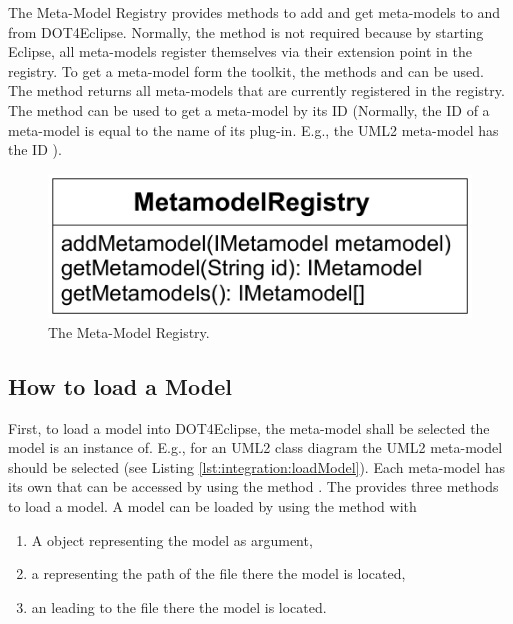 The Meta-Model Registry provides methods to add and get meta-models to and from \acl{DOT4Eclipse}. Normally, the method  is not required because by starting Eclipse, all meta-models register themselves via their extension point in the registry. To get a meta-model form the toolkit, the methods  and  can be used. The method  returns all meta-models that are currently registered in the registry. The method  can be used to get a meta-model by its ID (Normally, the ID of a meta-model is equal to the name of its plug-in. E.g., the \acs{UML}2 meta-model has the ID ).

\begin{figure}[!b]
	\centering
	\includegraphics[width=.55\linewidth]{figures/integration/metaModelRegistry}
	\caption{The Meta-Model Registry.}
	\label{pic:integration:metaModelRegistry}
\end{figure}


\subsection{How to load a Model}

First, to load a model into \acl{DOT4Eclipse}, the meta-model shall be selected the model is an instance of. E.g., for an \acs{UML}2 class diagram the \acs{UML}2 meta-model should be selected (see Listing \ref{lst:integration:loadModel}). Each meta-model has its own  that can be accessed by using the method . The  provides three methods to load a model. A model can be loaded by using the method  with

\begin{enumerate}
	\item A  object representing the model as argument,
	\item a  representing the path of the file there the model is located,
	\item an  leading to the file there the model is located.
\end{enumerate}

